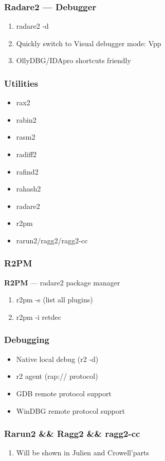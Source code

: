 \documentclass[10pt,pdf,utf8,english,compress,hyperref={unicode}]{beamer}
\begin{document}
\begin{frame}[fragile]
  \frametitle{Radare2 — Debugger}
  \begin{enumerate}
  \item radare2 -d
  \item Quickly switch to Visual debugger mode: Vpp
  \item OllyDBG/IDApro shortcuts friendly
 \end{enumerate}
\end{frame}

\begin{frame}[fragile]
  \frametitle{Utilities}
     \begin{itemize}
        \item rax2
        \item rabin2
        \item rasm2
        \item radiff2
        \item rafind2
        \item rahash2
        \item radare2
				\item \alert{r2pm}
        \item rarun2/ragg2/ragg2-cc
      \end{itemize}
\end{frame}

\begin{frame}[fragile]
  \frametitle{R2PM}
	\center\textbf{R2PM} — radare2 package manager
  \noindent\makebox[\linewidth]{\rule{\paperwidth}{0.4pt}}
  \begin{enumerate}
  \item r2pm -s (list all plugins)
	\item r2pm -i retdec
 \end{enumerate}
\end{frame}
\begin{frame}[fragile]
  \frametitle{Debugging}
  \begin{itemize}
	\item Native local debug (r2 -d)
	\item r2 agent (rap:// protocol)
	\item GDB remote protocol support
	\item WinDBG remote protocol support
  \end{itemize}
\end{frame}

\begin{frame}[fragile]
  \frametitle{Rarun2 \&\& Ragg2 \&\& ragg2-cc}
  \noindent\makebox[\linewidth]{\rule{\paperwidth}{0.4pt}}
  \begin{enumerate}
  \item Will be shown in Julien and Crowell'parts
 \end{enumerate}
\end{frame}
\end{document}

